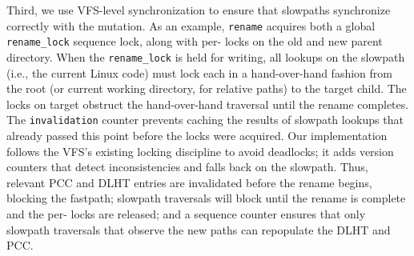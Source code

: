Third, we use VFS-level synchronization to ensure that slowpaths synchronize correctly 
with the mutation. 
As an example, {\tt rename}
acquires both
a global {\tt rename\_lock} sequence lock, along with per-\dentry{}
locks on the old and new parent directory.
When the {\tt rename\_lock} is held for writing, all lookups on the slowpath 
(i.e., the current Linux code)
must lock each \dentry{}
in a hand-over-hand fashion from the root (or current working directory, for relative paths) 
to the target child.
The locks on target \dentries{} obstruct the hand-over-hand traversal until the rename completes.
The {\tt invalidation} counter prevents caching the results of slowpath lookups that already passed 
this point before the \dentry{} locks were acquired.
Our implementation follows the VFS's existing locking discipline to avoid deadlocks;
it adds version counters that detect inconsistencies and falls back on the slowpath.
Thus, 
relevant PCC and DLHT entries are invalidated before the rename begins, blocking the fastpath;
slowpath traversals will block until the rename is complete
and the per-\dentry{} locks are released;
and a sequence counter ensures that only slowpath traversals that observe the new paths can repopulate the DLHT and PCC.





